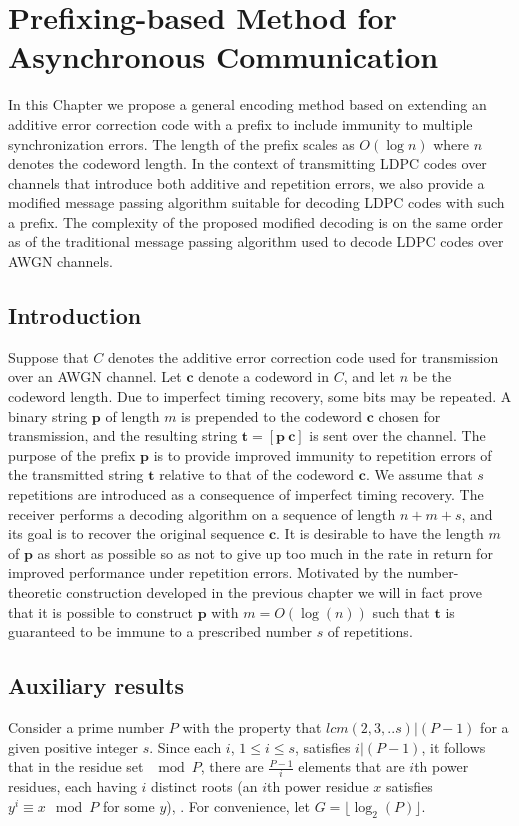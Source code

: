\chapter[Prefixing-based Method for Asynchronous Communication]{Prefixing-based Method for Asynchronous
Communication}\label{prefixing}

In this Chapter  we propose a general encoding method based on
extending an additive error correction code with a prefix to
include immunity to multiple synchronization errors. The length of
the prefix scales as $O(\log n)$ where $n$ denotes the codeword
length. In the context of transmitting LDPC codes over channels
that introduce both additive and repetition errors, we also
provide a modified message passing algorithm suitable for decoding
LDPC codes with such a prefix. The complexity of the proposed
modified decoding is on the same order as of the traditional
message passing algorithm used to decode LDPC codes over AWGN
channels.
\section{Introduction}

 Suppose that
$C$ denotes the additive error correction code used for
transmission over an AWGN channel. Let $\mathbf{c}$ denote a
codeword in $C$, and let $n$ be the codeword length. Due to
imperfect timing recovery, some bits may be repeated. A binary
string $\mathbf{p}$ of length $m$ is prepended to the codeword
$\mathbf{c}$ chosen for transmission, and the resulting string
$\mathbf{t}=[\mathbf{p}~ \mathbf{c}]$ is sent over the channel.
The purpose of the prefix $\mathbf{p}$ is to provide improved
immunity to repetition errors of the transmitted string
$\mathbf{t}$ relative to that of the codeword $\mathbf{c}$. We
assume that $s$ repetitions are introduced as a consequence of
imperfect timing recovery. The receiver performs a decoding
algorithm on a sequence of length $n+m+s$, and its goal is to
recover the original sequence $\mathbf{c}$. It is desirable to
have the length $m$ of $\mathbf{p}$  as short as possible so as
not to give up too much in the rate in return for improved
performance under repetition errors. Motivated by the
number-theoretic construction developed in the previous chapter we
will in fact prove that it is possible to construct $\mathbf{p}$
with $m=O(\log(n))$ such that $\mathbf{t}$ is guaranteed to be
immune to a prescribed number $s$ of repetitions.

\section{Auxiliary results}\label{aux}
Consider a prime number $P$ with the property that $lcm(2,3,..s) |
(P-1)$ for a given positive integer $s$. Since each $i$, $1 \leq i
\leq s$, satisfies $i|(P-1)$, it follows that in the residue set
$\mod P$, there are $\frac{P-1}{i}$ elements that are $i$th power
residues, each having $i$ distinct roots (an $i$th power residue
$x$ satisfies $y^i \equiv x \mod P$ for some $y$), \cite{apostol}.
For convenience, let $G = \lfloor \log_2(P) \rfloor$.

